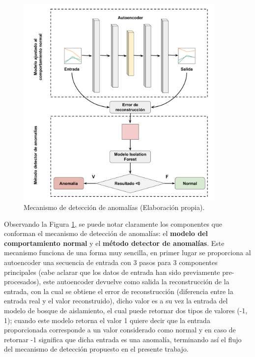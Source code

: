 \begin{figure}[H]
        \centering
            \includegraphics[width=0.92\textwidth, frame]{imagenes/Cap5/mecanismo}
        \caption{Mecanismo de detecci\'{o}n de anomal\'{i}as (Elaboraci\'{o}n propia).}
		\label{fig:mecanismo}
\end{figure}

Observando la Figura \ref{fig:mecanismo}, se puede notar claramente los componentes que conforman el mecanismo de detecci\'{o}n de anomal\'{i}as: el \textbf{modelo del comportamiento normal} y el \textbf{m\'{e}todo detector de anomal\'{i}as}. Este mecanismo funciona de una forma muy sencilla, en primer lugar se proporciona al autoencoder una secuencia de entrada con 3 pasos para 3 componentes principales (cabe aclarar que los datos de entrada han sido previamente pre-procesados), este autoencoder devuelve como salida la reconstrucci\'{o}n de la entrada, con la cual se obtiene el error de reconstrucci\'{o}n (diferencia entre la entrada real y el valor reconstruido), dicho valor es a su vez la entrada del modelo de bosque de aislamiento, el cual puede retornar dos tipos de valores (-1, 1); cuando este modelo retorna el valor 1 quiere decir que la entrada proporcionada corresponde a un valor considerado como normal y en caso de retornar -1 significa que dicha entrada es una anomal\'{i}a, terminando as\'{i} el flujo del mecanismo de detecci\'{o}n propuesto en el presente trabajo.

